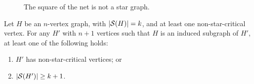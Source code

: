 \begin{figure}[!htb]
        \centering
        \caption{The square of the net is not a star graph.\label{fig:square_not_star}}
\end{figure}

\begin{theorem}
    \label{thm:monotonicity}
    Let $H$ be an $n$-vertex graph, with $|\mathcal{S}(H)| = k$, and at least one non-star-critical vertex.
    For any $H'$ with $n+1$ vertices such that $H$ is an induced subgraph of $H'$, at least one of the following holds:
    \begin{enumerate}
        \item $H'$ has non-star-critical vertices; or
        \item $|\mathcal{S}(H')| \geq k+1$.
    \end{enumerate}
\end{theorem}

